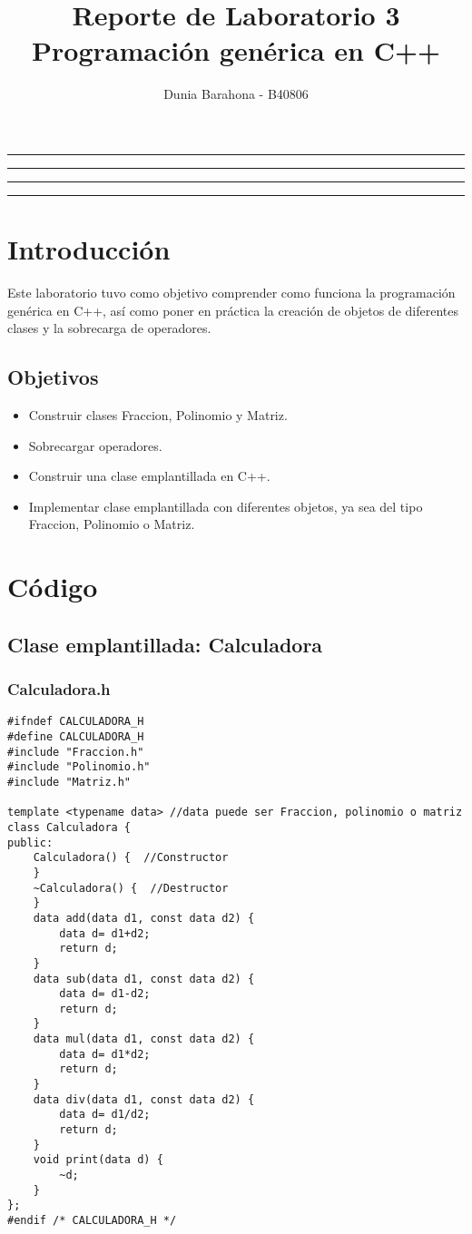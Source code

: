 \documentclass[11pt]{article}
\title{Reporte de Laboratorio 3\\Programación genérica en C++}
\author{Dunia Barahona - B40806}
\begin{document}
\maketitle
\hrule
\hrule
\tableofcontents
\hspace{5mm}
\hrule
\hrule

\section{Introducción}
Este laboratorio tuvo como objetivo comprender como funciona la programación genérica en C++, así como poner en práctica la creación de objetos de diferentes clases y la sobrecarga de operadores.
\subsection{Objetivos}
\begin{itemize}
	\item Construir clases Fraccion, Polinomio y Matriz.
	\item Sobrecargar operadores.
	\item Construir una clase emplantillada en C++.
	\item Implementar clase emplantillada con diferentes objetos, ya sea del tipo Fraccion, Polinomio o Matriz.
	
\end{itemize}
\newpage
\section{Código}
\lstset{inputencoding=utf8/latin1}

\subsection{Clase emplantillada: Calculadora}
\subsubsection*{Calculadora.h}
\begin{lstlisting}
#ifndef CALCULADORA_H
#define CALCULADORA_H
#include "Fraccion.h"
#include "Polinomio.h"
#include "Matriz.h"

template <typename data> //data puede ser Fraccion, polinomio o matriz
class Calculadora {
public:	
	Calculadora() {  //Constructor
	}
	~Calculadora() {  //Destructor
	}
	data add(data d1, const data d2) {  
		data d= d1+d2;
		return d;
	}
	data sub(data d1, const data d2) {  
		data d= d1-d2;
		return d;
	}
	data mul(data d1, const data d2) {  
		data d= d1*d2;
		return d;
	}
	data div(data d1, const data d2) {
		data d= d1/d2;
		return d;
	}
	void print(data d) {
		~d;
	}
};
#endif /* CALCULADORA_H */
\end{lstlisting}
\newpage
\end{document}
